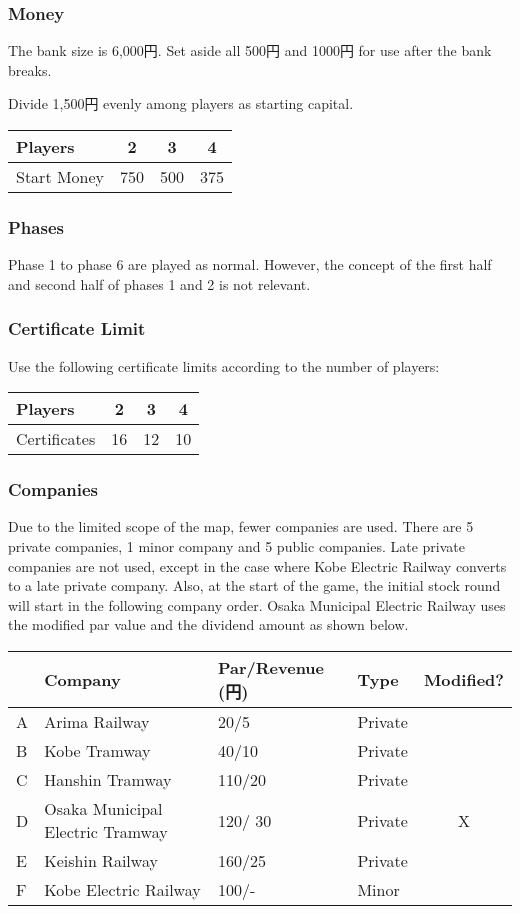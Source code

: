 \begin{multicols}{2}
\subsubsection{Money}
The bank size is 6,000円. Set aside all 500円 and 1000円 for
use after the bank breaks.

Divide 1,500円 evenly among players as starting capital.

\begin{tabular}{|l|c|c|c|}
\hline
Players & 2 & 3 & 4 \\
\hline
Start Money & 750 & 500 & 375 \\
\hline
\end{tabular}

\subsubsection{Phases}
Phase 1 to phase 6 are played as normal. However, the concept of the
first half and second half of phases 1 and 2 is not relevant.

\subsubsection{Certificate Limit}
Use the following certificate limits according to the number of players:

\begin{tabular}{|l|c|c|c|}
\hline
Players & 2 & 3 & 4 \\
\hline
Certificates & 16 & 12 & 10 \\
\hline
\end{tabular}

\subsubsection{Companies}
Due to the limited scope of the map, fewer companies are used. There
are 5 private companies, 1 minor company and 5 public companies. Late
private companies are not used, except in the case where Kobe Electric
Railway converts to a late private company. Also, at the start of the
game, the initial stock round will start in the following company
order. Osaka Municipal Electric Railway uses the modified par
value and the dividend amount as shown below.

\begin{tabular}{lp{2cm}llc}
 & Company & Par/Revenue (円) & Type & Modified? \\
\hline
A & Arima Railway & 20/5 & Private  & \\
B & Kobe Tramway & 40/10 & Private  & \\
C & Hanshin Tramway & 110/20 & Private  & \\
D & Osaka Municipal Electric Tramway & 120/ 30 & Private  & X \\
E & Keishin Railway & 160/25 & Private & \\
F & Kobe Electric Railway & 100/- & Minor & \\
\end{tabular}


\end{multicols}
